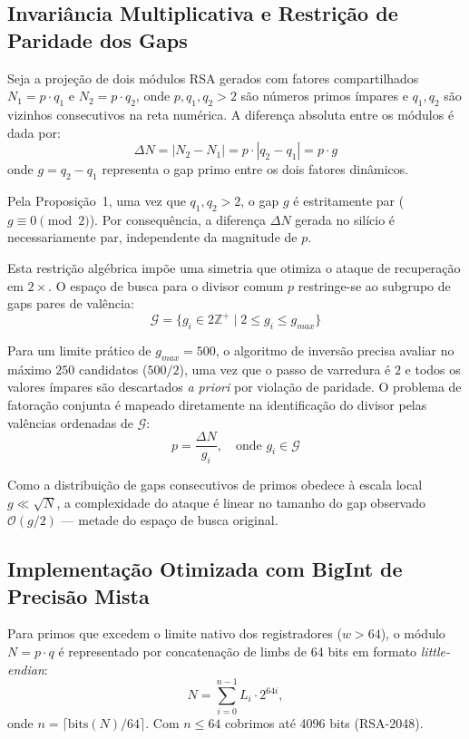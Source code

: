 \documentclass[12pt,a4paper]{article}
\theoremstyle{plain}
\begin{document}
\subsection{Invariância Multiplicativa e Restrição de Paridade dos Gaps}

Seja a projeção de dois módulos RSA gerados com fatores compartilhados
$N_1 = p \cdot q_1$ e $N_2 = p \cdot q_2$, onde
$p, q_1, q_2 > 2$ são números primos ímpares e $q_1, q_2$ são vizinhos
consecutivos na reta numérica.  A diferença absoluta entre os módulos
é dada por:
\[
\Delta N = |N_2 - N_1| = p \cdot |q_2 - q_1| = p \cdot g
\]
onde $g = q_2 - q_1$ representa o gap primo entre os dois fatores
dinâmicos.

Pela Proposição~1, uma vez que $q_1, q_2 > 2$, o gap $g$ é
estritamente par ($g \equiv 0 \pmod 2$).  Por consequência, a
diferença $\Delta N$ gerada no silício é necessariamente par,
independente da magnitude de $p$.

Esta restrição algébrica impõe uma simetria que otimiza o ataque
de recuperação em $2\times$.  O espaço de busca para o divisor
comum $p$ restringe-se ao subgrupo de gaps pares de valência:
\[
\mathcal{G} = \{ g_i \in 2\mathbb{Z}^+ \mid 2 \le g_i \le g_{max} \}
\]

Para um limite prático de $g_{max} = 500$, o algoritmo de inversão
precisa avaliar no máximo $250$ candidatos ($500/2$),
uma vez que o passo de varredura é $2$ e todos os valores ímpares
são descartados \textit{a priori}
por violação de paridade.  O problema de fatoração conjunta é mapeado
diretamente na identificação do divisor pelas valências ordenadas de
$\mathcal{G}$:
\[
p = \frac{\Delta N}{g_i}, \quad \text{onde } g_i \in \mathcal{G}
\]

Como a distribuição de gaps consecutivos de primos obedece à escala
local $g \ll \sqrt{N}$, a complexidade do ataque é linear no tamanho
do gap observado $\mathcal{O}(g/2)$ — metade do espaço de busca
original.

\subsection{Implementação Otimizada com BigInt de Precisão Mista}

Para primos que excedem o limite nativo dos registradores ($w > 64$),
o módulo $N = p \cdot q$ é representado por concatenação de limbs de
64 bits em formato \textit{little-endian}:
\[
N = \sum_{i=0}^{n-1} L_i \cdot 2^{64i},
\]
onde $n = \lceil \text{bits}(N) / 64 \rceil$.  Com $n \leq 64$
cobrimos até 4096 bits (RSA-2048).
\end{document}
